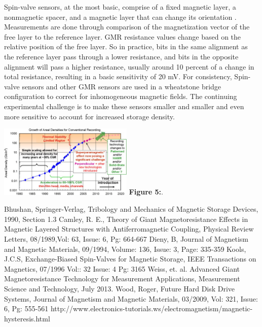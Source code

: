 \documentclass[11pt]{article}
\begin{document}
\begin{multicols}{2}
Spin-valve sensors, at the most basic, comprise of a fixed magnetic layer, a nonmagnetic spacer, and a magnetic layer that can change its orientation \cite{label3}. Measurements  are done through comparison of the magnetization vector of the free layer to the reference layer. GMR resistance values change based on the relative position of the free layer. So in practice, bits in the same alignment as the reference layer pass through a lower resistance, and bits in the opposite alignment will pass a higher resistance, usually around 10 percent of a change in total resistance, resulting in a basic sensitivity of 20 mV. For consistency, Spin-valve sensors and other GMR sensors are used in a wheatstone bridge configuration to correct for inhomogeneous magnetic fields. The continuing experimental challenge is to make these sensors smaller and smaller and even more sensitive to account for increased storage density.

\begin{center}
	\centering
	\includegraphics[width=0.48\textwidth]{region_of_stability.png}
	{\footnotesize\textbf{Figure 5:}. \cite{label6}} 
\end{center} 



\begin{thebibliography}{9}
	{\footnotesize
	 Bhushan, Springer-Verlag, Tribology and Mechanics of Magnetic Storage Devices, 1990, Section 1.3 
	 Camley, R. E., Theory of Giant Magnetoresistance Effects in Magnetic Layered Structures with Antiferromagnetic Coupling, Physical Review Letters, 08/1989,Vol: 63, Issue: 6, Pg: 664-667
	 Dieny, B, Journal of Magnetism and Magnetic Materials, 09/1994, Volume: 136, Issue: 3, Page: 335-359
	 Kools, J.C.S, Exchange-Biased Spin-Valves for Magnetic Storage, IEEE Transactions on Magnetics, 07/1996 Vol:: 32 Issue: 4 Pg: 3165
	Weiss, et. al. Advanced Giant Magnetoresistance Technology for Measurement Applications, Measurement Science and Technology, July 2013.  
	 Wood, Roger, Future Hard Disk Drive Systems, Journal of Magnetism and Magnetic Materials, 03/2009, Vol: 321, Issue: 6, Pg: 555-561
	 http://www.electronics-tutorials.ws/electromagnetism/magnetic-hysteresis.html
	
	}
\end{thebibliography}

\end{multicols}%

\end{document}

